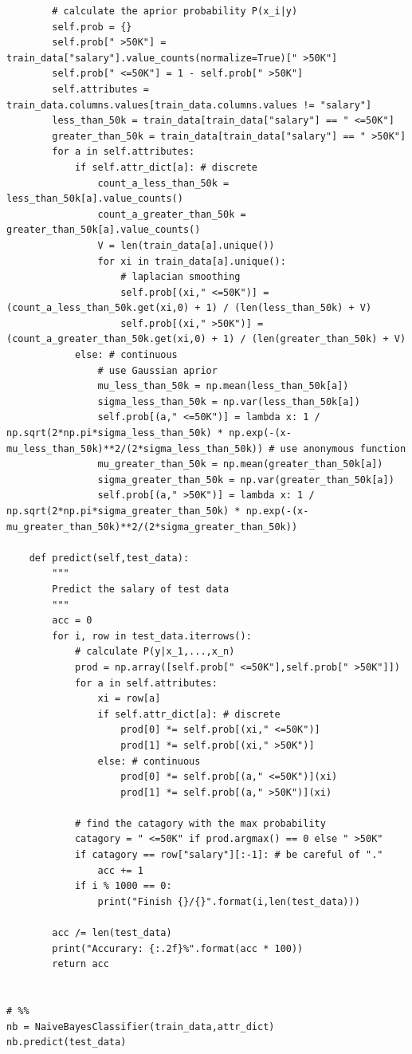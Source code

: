 \documentclass[a4paper, 11pt]{article}
\begin{document}
\begin{lstlisting}
        # calculate the aprior probability P(x_i|y)
        self.prob = {}
        self.prob[" >50K"] = train_data["salary"].value_counts(normalize=True)[" >50K"]
        self.prob[" <=50K"] = 1 - self.prob[" >50K"]
        self.attributes = train_data.columns.values[train_data.columns.values != "salary"]
        less_than_50k = train_data[train_data["salary"] == " <=50K"]
        greater_than_50k = train_data[train_data["salary"] == " >50K"]
        for a in self.attributes:
            if self.attr_dict[a]: # discrete
                count_a_less_than_50k = less_than_50k[a].value_counts()
                count_a_greater_than_50k = greater_than_50k[a].value_counts()
                V = len(train_data[a].unique())
                for xi in train_data[a].unique():
                    # laplacian smoothing
                    self.prob[(xi," <=50K")] = (count_a_less_than_50k.get(xi,0) + 1) / (len(less_than_50k) + V)
                    self.prob[(xi," >50K")] = (count_a_greater_than_50k.get(xi,0) + 1) / (len(greater_than_50k) + V)
            else: # continuous
                # use Gaussian aprior
                mu_less_than_50k = np.mean(less_than_50k[a])
                sigma_less_than_50k = np.var(less_than_50k[a])
                self.prob[(a," <=50K")] = lambda x: 1 / np.sqrt(2*np.pi*sigma_less_than_50k) * np.exp(-(x-mu_less_than_50k)**2/(2*sigma_less_than_50k)) # use anonymous function
                mu_greater_than_50k = np.mean(greater_than_50k[a])
                sigma_greater_than_50k = np.var(greater_than_50k[a])
                self.prob[(a," >50K")] = lambda x: 1 / np.sqrt(2*np.pi*sigma_greater_than_50k) * np.exp(-(x-mu_greater_than_50k)**2/(2*sigma_greater_than_50k))

    def predict(self,test_data):
        """
        Predict the salary of test data
        """
        acc = 0
        for i, row in test_data.iterrows():
            # calculate P(y|x_1,...,x_n)
            prod = np.array([self.prob[" <=50K"],self.prob[" >50K"]])
            for a in self.attributes:
                xi = row[a]
                if self.attr_dict[a]: # discrete
                    prod[0] *= self.prob[(xi," <=50K")]
                    prod[1] *= self.prob[(xi," >50K")]
                else: # continuous
                    prod[0] *= self.prob[(a," <=50K")](xi)
                    prod[1] *= self.prob[(a," >50K")](xi)

            # find the catagory with the max probability
            catagory = " <=50K" if prod.argmax() == 0 else " >50K"
            if catagory == row["salary"][:-1]: # be careful of "."
                acc += 1
            if i % 1000 == 0:
                print("Finish {}/{}".format(i,len(test_data)))

        acc /= len(test_data)
        print("Accurary: {:.2f}%".format(acc * 100))
        return acc


# %%
nb = NaiveBayesClassifier(train_data,attr_dict)
nb.predict(test_data)
\end{lstlisting}
\end{document}
